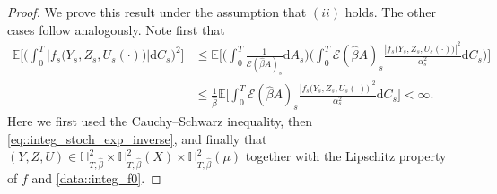 \documentclass[10pt]{article} %
\newcommand\cE{\mathcal E}
\def \E{\mathbb{E}}
\def \H{\mathbb{H}}
\def\d{\mathrm{d}}
\begin{document}
\begin{proof}
	We prove this result under the assumption that $(ii)$ holds. The other cases follow analogously. Note first that 
	\begin{align*}
		\E\bigg[\bigg(\int_0^T |f_s\big(Y_s,Z_s,U_s(\cdot)\big)| \d C_s\bigg)^2\bigg] 
		&\leq \E\bigg[\bigg(\int_0^T\frac{1}{\cE(\hat\beta A)_{s}}\d A_s\bigg)\bigg(\int_0^T \cE(\hat\beta A)_{s}\frac{|f_s\big(Y_s,Z_s,U_s(\cdot)\big)|^2}{\alpha^2_s} \d C_s\bigg)\bigg] \\
		&\leq  \frac{1}{\hat\beta}\E\bigg[\int_0^T \cE(\hat\beta A)_{s}\frac{|f_s\big(Y_s,Z_s,U_s(\cdot)\big)|^2}{\alpha^2_s} \d C_s\bigg] < \infty.
	\end{align*}
	Here we first used the Cauchy--Schwarz inequality, then \eqref{eq::integ_stoch_exp_inverse}, and finally that $(Y,Z,U) \in \H^2_{T,\hat\beta} \times \H^2_{T,\hat\beta}(X) \times \H^2_{T,\hat\beta}(\mu)$ together with the Lipschitz property of $f$ and \ref{data::integ_f0}. 
	

\end{proof}
\end{document}
